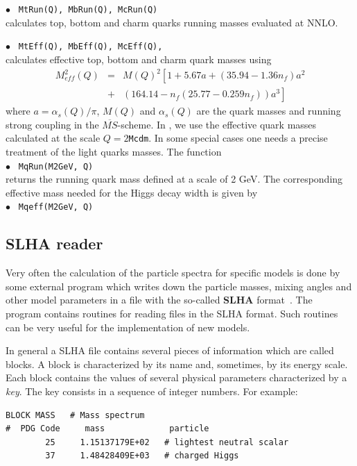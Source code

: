 \documentclass[12pt,a4paper]{article}
\begin{document}
{\noindent$\bullet$ \verb| MtRun(Q), MbRun(Q), McRun(Q) | \\
calculates top, bottom and charm quarks running masses evaluated
at NNLO.

\noindent$\bullet$ \verb| MtEff(Q), MbEff(Q), McEff(Q),  | \\
calculates effective top, bottom and charm quark masses using
~\cite{Eidelman:2004wy}
\begin{eqnarray}
\label{meff}
 M_{eff}^2(Q)&=&M(Q)^2\left[1+5.67a + (35.94-1.36n_f)a^2 \right.\nonumber\\
 &+& \left.(164.14-n_f(25.77-0.259n_f))a^3\right]
\end{eqnarray}
where $a=\alpha_s(Q)/\pi$,    $M(Q)$  and $\alpha_s(Q)$    are the
quark masses and running strong coupling  in the
$\overline{MS}$-scheme. In \micro, we use the effective
quark masses calculated at the scale $Q=2${\tt Mcdm}.
In some special cases one needs a precise treatment of the light quarks masses. The function\\
\noindent$\bullet$ \verb| MqRun(M2GeV, Q)| \\
returns the  running quark mass defined at a scale of 2 GeV. The corresponding
effective mass needed for the Higgs decay width is given by \\
\noindent$\bullet$ \verb| Mqeff(M2GeV, Q)|


\subsection{SLHA reader}
\label{SLHA} 
Very often the calculation of the particle spectra for specific 
models is done by some external program which writes down 
the particle masses, mixing angles and other 
model parameters in a file with the so-called  {\bf SLHA} format~\cite{Skands:2003cj,Allanach:2008qq}. 
The \micro~ program contains routines for  reading files in the SLHA format. 
Such routines can be very useful for the implementation of new models.

In general a SLHA file contains several pieces of information 
which are called blocks. A block is characterized by its name and,
sometimes, by its energy scale. Each block contains the values of several physical parameters 
characterized by a {\it key}. The  key consists in a sequence of 
integer numbers. For example:
{\small
\begin{verbatim}
BLOCK MASS   # Mass spectrum
#  PDG Code     mass             particle
        25     1.15137179E+02   # lightest neutral scalar
        37     1.48428409E+03   # charged Higgs
  

\end{verbatim}}}
\end{document}
